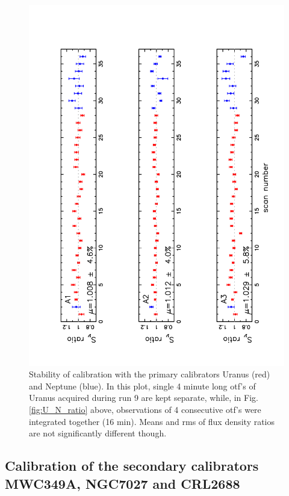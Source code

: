\begin{figure}[p]
\begin{center}
  \includegraphics[clip, angle=-90, scale=0.6]{Figures/Flux_ratio_index_A1_A2_A3.pdf}
  \caption{Stability of calibration with the primary calibrators Uranus (red) and Neptune (blue).
    In this plot, single 4 minute long otf's of Uranus acquired during
    run 9 are kept separate, 
while, in Fig.\ref{fig:U_N_ratio} above, observations of 4 consecutive otf's were integrated together (16 min).
    Means and rms of flux density ratios are not significantly different though.}
\label{fig:U_otf_indiv}
\end{center}
\end{figure}

\clearpage
\newpage

\subsection{Calibration of the secondary calibrators MWC349A, NGC7027 and CRL2688}

